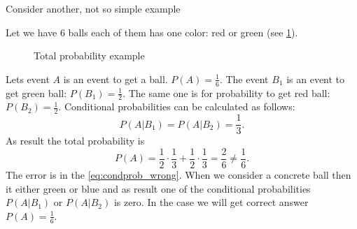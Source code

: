 Consider another, not so simple example
\begin{example}
Let we have 6 balls each of them has one color: red or green (see
\cref{fig:excondprobability_add}). 
\begin{figure}[H]
  \centering
  \caption{Total probability example}
  \label{fig:excondprobability_add}
\end{figure}
Lets event $A$ is an event to get a ball. $P(A) = \frac{1}{6}$. The
event $B_1$ is an event to get green ball: $P(B_1) = \frac{1}{2}$. The
same one is for probability to get red ball: $P(B_2) = \frac{1}{2}$.
Conditional probabilities can be calculated as follows:
\begin{equation}
P(A|B_1) = P(A|B_2) = \frac{1}{3}.
\label{eq:condprob_wrong}
\end{equation}
As result the total probability is 
\[
P(A) = \frac{1}{2}\cdot\frac{1}{3} + \frac{1}{2}\cdot\frac{1}{3} =
\frac{2}{6} \ne \frac{1}{6}.
\]
The error is in the \eqref{eq:condprob_wrong}. When we consider a
concrete ball then it either green or blue and as result one of the
conditional probabilities $P(A|B_1)$ or $P(A|B_2)$ is zero. In the
case we will get correct answer $P(A) = \frac{1}{6}$.
\end{example}

